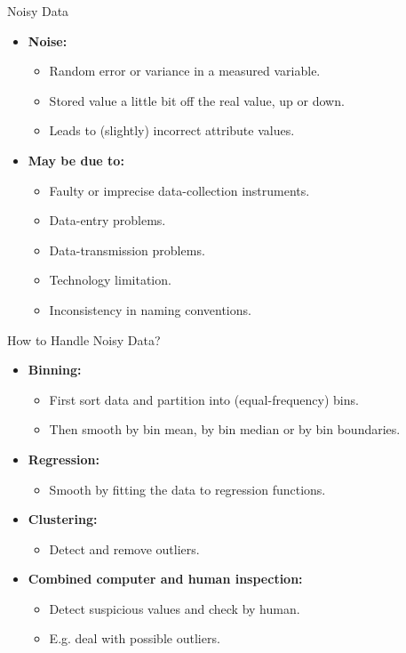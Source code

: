 \begin{frame}{Noisy Data}
	\begin{itemize}
		\item \textbf{\color{airforceblue}Noise:}
		      \begin{itemize}
			      \item Random error or variance in a measured variable.
			      \item Stored value a little bit off the real value, up or down.
			      \item Leads to (slightly) incorrect attribute values.
		      \end{itemize}
		\item \textbf{May be due to:}
		      \begin{itemize}
			      \item Faulty or imprecise data-collection instruments.
			      \item Data-entry problems.
			      \item Data-transmission problems.
			      \item Technology limitation.
			      \item Inconsistency in naming conventions.
		      \end{itemize}
	\end{itemize}
\end{frame}

\begin{frame}{How to Handle Noisy Data?}
	\begin{itemize}
		\item \textbf{Binning:}
		      \begin{itemize}
			      \item First sort data and partition into (equal-frequency) bins.
			      \item Then smooth by bin mean, by bin median or by bin boundaries.
		      \end{itemize}
		\item \textbf{Regression:}
		      \begin{itemize}
			      \item Smooth by fitting the data to regression functions.
		      \end{itemize}
		\item \textbf{Clustering:}
		      \begin{itemize}
			      \item Detect and remove outliers.
		      \end{itemize}
		\item \textbf{Combined computer and human inspection:}
		      \begin{itemize}
			      \item Detect suspicious values and check by human.
			      \item E.g. deal with possible outliers.
		      \end{itemize}
	\end{itemize}
\end{frame}

